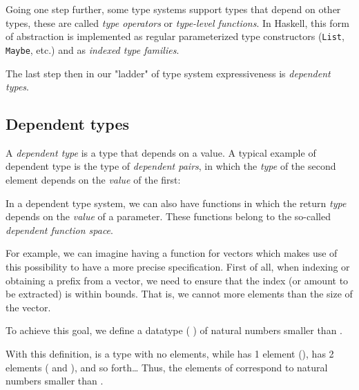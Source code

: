             Going one step further, some type systems support types that depend on other types, these are
            called \emph{type operators} or \emph{type-level functions}.
            In Haskell, this form of abstraction is implemented as regular parameterized type constructors
            (\texttt{List}, \texttt{Maybe}, etc.) and as \emph{indexed type families}.

            The last step then in our "ladder" of type system expressiveness is \emph{dependent types}.

        \subsection{Dependent types}
        \label{subsec:dependent-types}

            A \emph{dependent type} is a type that depends on a value.
            A typical example of dependent type is the type of \emph{dependent pairs},
            in which the \emph{type} of the second element depends on the \emph{value} of the first:
            \begin{listing}[h]
            \end{listing}

            In a dependent type system, we can also have functions in which the return \emph{type}
            depends on the \emph{value} of a parameter.
            These functions belong to the so-called \emph{dependent function space}.

            For example, we can imagine having a  function for vectors which makes use
            of this possibility to have a more precise specification.
            First of all, when indexing or obtaining a prefix from a vector,
            we need to ensure that the index (or amount to be extracted) is within bounds.
            That is, we cannot  more elements than the size of the vector.

            To achieve this goal, we define a datatype ( ) of natural numbers smaller than .
            \begin{listing}[h]
            \end{listing}

            With this definition,   is a type with no elements,
            while   has 1 element (),
              has 2 elements ( and  ), and so forth\ldots
            Thus, the elements of   correspond to natural numbers smaller than .

